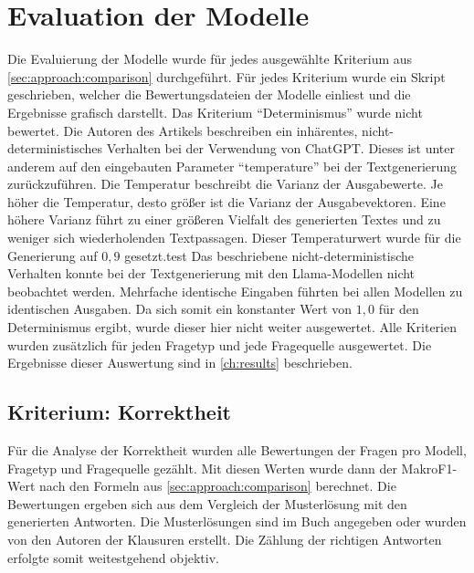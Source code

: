 \section{Evaluation der Modelle}\label{sec:evaluation}
Die Evaluierung der Modelle wurde für jedes ausgewählte Kriterium aus \cref{sec:approach:comparison} durchgeführt.
Für jedes Kriterium wurde ein Skript geschrieben, welcher die Bewertungsdateien der Modelle einliest und die Ergebnisse grafisch darstellt.
Das Kriterium \enquote{Determinismus} wurde nicht bewertet.
Die Autoren des Artikels \citet{chatgpt_qas} beschreiben ein inhärentes, nicht-deterministisches Verhalten bei der Verwendung von ChatGPT.
Dieses ist unter anderem auf den eingebauten Parameter \enquote{temperature} bei der Textgenerierung zurückzuführen.
Die Temperatur beschreibt die Varianz der Ausgabewerte.
Je höher die Temperatur, desto größer ist die Varianz der Ausgabevektoren.
Eine höhere Varianz führt zu einer größeren Vielfalt des generierten Textes und zu weniger sich wiederholenden Textpassagen.
Dieser Temperaturwert wurde für die Generierung auf $0,9$ gesetzt.test
Das beschriebene nicht-deterministische Verhalten konnte bei der Textgenerierung mit den Llama-Modellen nicht beobachtet werden.
Mehrfache identische Eingaben führten bei allen Modellen zu identischen Ausgaben.
Da sich somit ein konstanter Wert von $1,0$ für den Determinismus ergibt, wurde dieser hier nicht weiter ausgewertet.
Alle Kriterien wurden zusätzlich für jeden Fragetyp und jede Fragequelle ausgewertet.
Die Ergebnisse dieser Auswertung sind in \cref{ch:results} beschrieben.\\

\subsection{Kriterium: Korrektheit}
Für die Analyse der Korrektheit wurden alle Bewertungen der Fragen pro Modell, Fragetyp und Fragequelle gezählt.
Mit diesen Werten wurde dann der MakroF1-Wert nach den Formeln aus \cref{sec:approach:comparison} berechnet.
Die Bewertungen ergeben sich aus dem Vergleich der Musterlösung mit den generierten Antworten.
Die Musterlösungen sind im Buch angegeben oder wurden von den Autoren der Klausuren erstellt.
Die Zählung der richtigen Antworten erfolgte somit weitestgehend objektiv.

